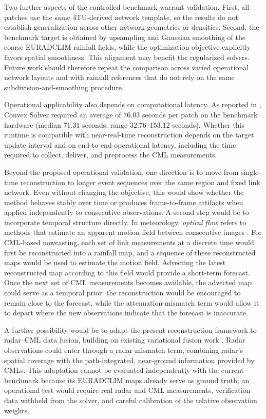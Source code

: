 \documentclass[11pt]{article}
\begin{document}
{\color{black}Two further aspects of the controlled benchmark warrant validation. First, all patches use the same 4TU-derived network template, so the results do not establish generalization across other network geometries or densities. Second, the benchmark target is obtained by upsampling and Gaussian smoothing of the coarse EURADCLIM rainfall fields, while the optimization objective explicitly favors spatial smoothness. This alignment may benefit the regularized solvers. Future work should therefore repeat the comparison across varied operational network layouts and with rainfall references that do not rely on the same subdivision-and-smoothing procedure.}

{\color{black}Operational applicability also depends on computational latency. As reported in , Convex Solver required an average of $76.03$ seconds per patch on the benchmark hardware (median $71.31$ seconds; range $32.76$--$153.12$ seconds). Whether this runtime is compatible with near-real-time reconstruction depends on the target update interval and on end-to-end operational latency, including the time required to collect, deliver, and preprocess the CML measurements.}

{\color{black}Beyond the proposed operational validation, one direction is to move from single-time reconstruction to longer event sequences over the same region and fixed link network. Even without changing the objective, this would show whether the method behaves stably over time or produces frame-to-frame artifacts when applied independently to consecutive observations. A second step would be to incorporate temporal structure directly. In meteorology, \emph{optical flow} refers to methods that estimate an apparent motion field between consecutive images \citep{ayzel2019optical}. For CML-based nowcasting, each set of link measurements at a discrete time would first be reconstructed into a rainfall map, and a sequence of these reconstructed maps would be used to estimate the motion field. Advecting the latest reconstructed map according to this field would provide a short-term forecast. Once the next set of CML measurements becomes available, the advected map could serve as a temporal prior: the reconstruction would be encouraged to remain close to the forecast, while the attenuation-mismatch term would allow it to depart where the new observations indicate that the forecast is inaccurate.}

{\color{black}A further possibility would be to adapt the present reconstruction framework to radar--CML data fusion, building on existing variational fusion work \citep{bianchi2013variational}. Radar observations could enter through a radar-mismatch term, combining radar's spatial coverage with the path-integrated, near-ground information provided by CMLs. This adaptation cannot be evaluated independently with the current benchmark because its EURADCLIM maps already serve as ground truth; an operational test would require real radar and CML measurements, verification data withheld from the solver, and careful calibration of the relative observation weights.}
\end{document}
